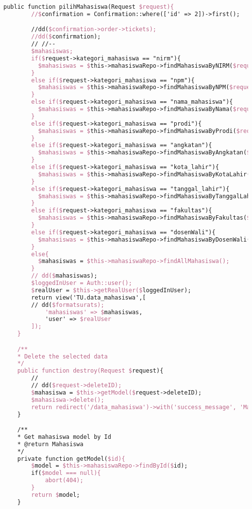 \begin{lstlisting}[language=tex,basicstyle=\tiny,caption=MahasiswasuratController.php]
    public function pilihMahasiswa(Request $request){
        //$confirmation = Confirmation::where(['id' => 2])->first();

        //dd($confirmation->order->tickets);
        //dd($confirmation);
        // //--
        $mahasiswas;
        if($request->kategori_mahasiswa == "nirm"){
          $mahasiswas = $this->mahasiswaRepo->findMahasiswaByNIRM($request->searchBox);
        }
        else if($request->kategori_mahasiswa == "npm"){
          $mahasiswas = $this->mahasiswaRepo->findMahasiswaByNPM($request->searchBox);
        }
        else if($request->kategori_mahasiswa == "nama_mahasiswa"){
          $mahasiswas = $this->mahasiswaRepo->findMahasiswaByNama($request->searchBox);
        }
        else if($request->kategori_mahasiswa == "prodi"){
          $mahasiswas = $this->mahasiswaRepo->findMahasiswaByProdi($request->searchBox);
        }
        else if($request->kategori_mahasiswa == "angkatan"){
          $mahasiswas = $this->mahasiswaRepo->findMahasiswaByAngkatan($request->searchBox);
        }
        else if($request->kategori_mahasiswa == "kota_lahir"){
          $mahasiswas = $this->mahasiswaRepo->findMahasiswaByKotaLahir($request->searchBox);
        }
        else if($request->kategori_mahasiswa == "tanggal_lahir"){
          $mahasiswas = $this->mahasiswaRepo->findMahasiswaByTanggalLahir($request->searchBox);
        }
        else if($request->kategori_mahasiswa == "fakultas"){
          $mahasiswas = $this->mahasiswaRepo->findMahasiswaByFakultas($request->searchBox);
        }
        else if($request->kategori_mahasiswa == "dosenWali"){
          $mahasiswas = $this->mahasiswaRepo->findMahasiswaByDosenWali($request->searchBox);
        }
        else{
          $mahasiswas = $this->mahasiswaRepo->findAllMahasiswa();
        }
        // dd($mahasiswas);
        $loggedInUser = Auth::user();
        $realUser = $this->getRealUser($loggedInUser);
        return view('TU.data_mahasiswa',[
        // dd($formatsurats);
            'mahasiswas' => $mahasiswas,
            'user' => $realUser
        ]);
  	}

    /**
    * Delete the selected data
    */
    public function destroy(Request $request){
        //
        // dd($request->deleteID);
        $mahasiswa = $this->getModel($request->deleteID);
        $mahasiswa->delete();
        return redirect('/data_mahasiswa')->with('success_message', 'Mahasiswa <b>#' . $request->id . '</b> berhasil dihapus.');;
    }

    /**
    * Get mahasiswa model by Id
    * @return Mahasiswa
    */
    private function getModel($id){
        $model = $this->mahasiswaRepo->findById($id);
        if($model === null){
            abort(404);
        }
        return $model;
    }


\end{lstlisting}

